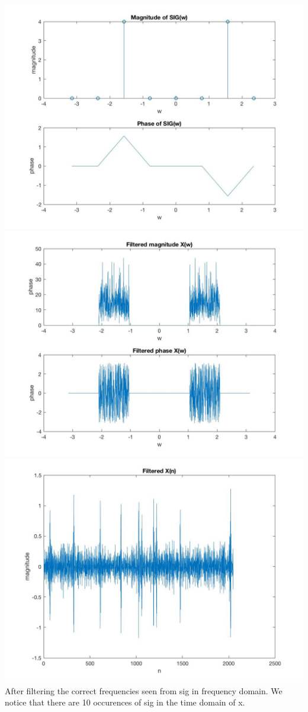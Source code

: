 \documentclass{article}
\begin{document}
\includegraphics[scale=.5]{Legends2}
\includegraphics[scale=.5]{legends3}
\includegraphics[scale=.5]{Legends4}
After filtering the correct frequencies seen from sig in frequency domain. We notice that there are 10 occurences of sig in the time domain of x.
\end{document}
